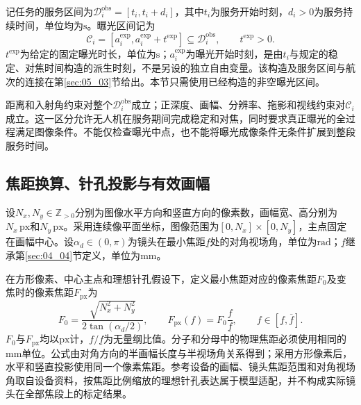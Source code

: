 记任务的服务区间为$\mathcal D_i^{\mathrm{obs}}=[t_i,t_i+d_i]$，其中$t_i$为服务开始时刻，$d_i>0$为服务持续时间，单位均为$\mathrm s$。曝光区间记为
\begin{equation}
 \mathcal C_i=[a_i^{\mathrm{exp}},a_i^{\mathrm{exp}}+t^{\mathrm{exp}}]
 \subseteq\mathcal D_i^{\mathrm{obs}},
 \qquad t^{\mathrm{exp}}>0.
 \label{s0405:exposure_domain}
\end{equation}
$t^{\mathrm{exp}}$为给定的固定曝光时长，单位为$\mathrm s$；$a_i^{\mathrm{exp}}$为曝光开始时刻，是由$t_i$与规定的稳定、对焦时间构造的派生时刻，不是另设的独立自由变量。该构造及服务区间与航次的连接在第\ref{sec:05_03}节给出。本节只需使用已经构造的非空曝光区间。

距离和入射角约束对整个$\mathcal D_i^{\mathrm{obs}}$成立；正深度、画幅、分辨率、拖影和视线约束对$\mathcal C_i$成立。这一区分允许无人机在服务期间完成稳定和对焦，同时要求真正曝光的全过程满足图像条件。不能仅检查曝光中点，也不能将曝光成像条件无条件扩展到整段服务时间。

\subsection{焦距换算、针孔投影与有效画幅}

设$N_x,N_y\in\mathbb Z_{>0}$分别为图像水平方向和竖直方向的像素数，画幅宽、高分别为$N_x\,\mathrm{px}$和$N_y\,\mathrm{px}$。采用连续像平面坐标，图像范围为$[0,N_x]\times[0,N_y]$，主点固定在画幅中心。设$\alpha_d\in(0,\pi)$为镜头在最小焦距$\underline f$处的对角视场角，单位为$\mathrm{rad}$；$\underline f$继承第\ref{sec:04_04}节定义，单位为$\mathrm{mm}$。

在方形像素、中心主点和理想针孔假设下，定义最小焦距对应的像素焦距$F_0$及变焦时的像素焦距$F_{\mathrm{px}}$为
\begin{equation}
 F_0=\frac{\sqrt{N_x^2+N_y^2}}{2\tan(\alpha_d/2)},
 \qquad
 F_{\mathrm{px}}(f)=F_0\frac{f}{\underline f},
 \qquad f\in[\underline f,\overline f].
 \label{s0405:pixel_focal}
\end{equation}
$F_0$与$F_{\mathrm{px}}$均以$\mathrm{px}$计，$f/\underline f$为无量纲比值。分子和分母中的物理焦距必须使用相同的$\mathrm{mm}$单位。公式由对角方向的半画幅长度与半视场角关系得到；采用方形像素后，水平和竖直投影使用同一个像素焦距。参考设备的画幅、镜头焦距范围和对角视场角取自设备资料\cite{DJIH20}，按焦距比例缩放的理想针孔表达属于模型适配，并不构成实际镜头在全部焦段上的标定结果。

